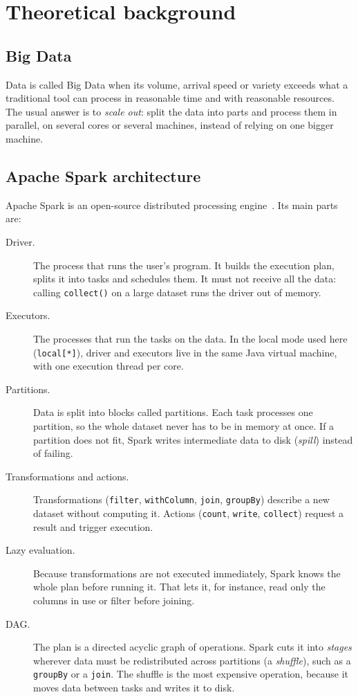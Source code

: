 \documentclass[11pt,a4paper]{article}
\begin{document}
\section{Theoretical background}

\subsection{Big Data}

Data is called Big Data when its volume, arrival speed or variety exceeds what a traditional
tool can process in reasonable time and with reasonable resources. The usual answer is to
\emph{scale out}: split the data into parts and process them in parallel, on several cores
or several machines, instead of relying on one bigger machine.

\subsection{Apache Spark architecture}

Apache Spark is an open-source distributed processing engine~\cite{zaharia2016,chambers2018}. Its main
parts are:

\begin{description}
  \item[Driver.] The process that runs the user's program. It builds the execution plan,
  splits it into tasks and schedules them. It must not receive all the data: calling
  \texttt{collect()} on a large dataset runs the driver out of memory.
  \item[Executors.] The processes that run the tasks on the data. In the local mode used
  here (\texttt{local[*]}), driver and executors live in the same Java virtual machine, with
  one execution thread per core.
  \item[Partitions.] Data is split into blocks called partitions. Each task processes one
  partition, so the whole dataset never has to be in memory at once. If a partition does not
  fit, Spark writes intermediate data to disk (\emph{spill}) instead of failing.
  \item[Transformations and actions.] Transformations (\texttt{filter},
  \texttt{withColumn}, \texttt{join}, \texttt{groupBy}) describe a new dataset without
  computing it. Actions (\texttt{count}, \texttt{write}, \texttt{collect}) request a result
  and trigger execution.
  \item[Lazy evaluation.] Because transformations are not executed immediately, Spark knows
  the whole plan before running it. That lets it, for instance, read only the columns in use
  or filter before joining.
  \item[DAG.] The plan is a directed acyclic graph of operations. Spark cuts it into
  \emph{stages} wherever data must be redistributed across partitions (a \emph{shuffle}),
  such as a \texttt{groupBy} or a \texttt{join}. The shuffle is the most expensive operation,
  because it moves data between tasks and writes it to disk.
\end{description}
\end{document}
